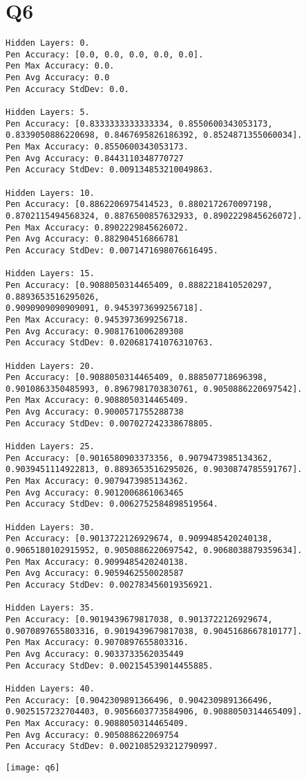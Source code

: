 \documentclass{article}
\begin{document}
\section*{Q6}
\begin{lstlisting}
Hidden Layers: 0.
Pen Accuracy: [0.0, 0.0, 0.0, 0.0, 0.0].
Pen Max Accuracy: 0.0.
Pen Avg Accuracy: 0.0
Pen Accuracy StdDev: 0.0.

Hidden Layers: 5.
Pen Accuracy: [0.8333333333333334, 0.8550600343053173,
0.8339050886220698, 0.8467695826186392, 0.8524871355060034].
Pen Max Accuracy: 0.8550600343053173.
Pen Avg Accuracy: 0.8443110348770727
Pen Accuracy StdDev: 0.009134853210049863.

Hidden Layers: 10.
Pen Accuracy: [0.8862206975414523, 0.8802172670097198,
0.8702115494568324, 0.8876500857632933, 0.8902229845626072].
Pen Max Accuracy: 0.8902229845626072.
Pen Avg Accuracy: 0.882904516866781
Pen Accuracy StdDev: 0.0071471698076616495.

Hidden Layers: 15.
Pen Accuracy: [0.9088050314465409, 0.8882218410520297, 0.8893653516295026,
0.9090909090909091, 0.9453973699256718].
Pen Max Accuracy: 0.9453973699256718.
Pen Avg Accuracy: 0.9081761006289308
Pen Accuracy StdDev: 0.020681741076310763.

Hidden Layers: 20.
Pen Accuracy: [0.9088050314465409, 0.888507718696398, 
0.9010863350485993, 0.8967981703830761, 0.9050886220697542].
Pen Max Accuracy: 0.9088050314465409.
Pen Avg Accuracy: 0.9000571755288738
Pen Accuracy StdDev: 0.007027242338678805.

Hidden Layers: 25.
Pen Accuracy: [0.9016580903373356, 0.9079473985134362,
0.9039451114922813, 0.8893653516295026, 0.9030874785591767].
Pen Max Accuracy: 0.9079473985134362.
Pen Avg Accuracy: 0.9012006861063465
Pen Accuracy StdDev: 0.0062752584898519564.

Hidden Layers: 30.
Pen Accuracy: [0.9013722126929674, 0.9099485420240138,
0.9065180102915952, 0.9050886220697542, 0.9068038879359634].
Pen Max Accuracy: 0.9099485420240138.
Pen Avg Accuracy: 0.9059462550028587
Pen Accuracy StdDev: 0.002783456019356921.

Hidden Layers: 35.
Pen Accuracy: [0.9019439679817038, 0.9013722126929674,
0.9070897655803316, 0.9019439679817038, 0.9045168667810177].
Pen Max Accuracy: 0.9070897655803316.
Pen Avg Accuracy: 0.9033733562035449
Pen Accuracy StdDev: 0.002154539014455885.

Hidden Layers: 40.
Pen Accuracy: [0.9042309891366496, 0.9042309891366496,
0.9025157232704403, 0.9056603773584906, 0.9088050314465409].
Pen Max Accuracy: 0.9088050314465409.
Pen Avg Accuracy: 0.905088622069754
Pen Accuracy StdDev: 0.0021085293212790997.
\end{lstlisting}

\texttt{[image: q6]}
\end{document}
